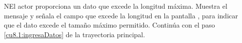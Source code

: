  \begin{UCtrayectoriaA}{N}{El actor proporciona un dato que excede la longitud máxima.}
    \UCpaso[\UCsist] Muestra el mensaje  y señala el campo que excede la 
    longitud en la pantalla , para indicar que el dato excede el tamaño máximo permitido.
    \UCpaso[] Continúa con el paso \ref{cu8.1:ingresaDatos} de la trayectoria principal.
 \end{UCtrayectoriaA}
 
